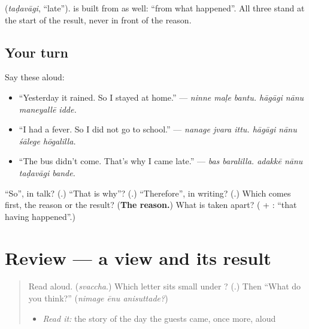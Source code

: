 \textbf{} (\emph{taḍavāgi}, \textquotedblleft{}late\textquotedblright{}). \textbf{} is built from \textbf{} as well: \textquotedblleft{}from what happened\textquotedblright{}. All three stand at the start of the result, never in front of the reason.

\subsection*{Your turn}
Say these aloud:

\begin{itemize}
\raggedright
  \item \textquotedblleft{}Yesterday it rained. So I stayed at home.\textquotedblright{} — \emph{ninne maḷe bantu. hāgāgi nānu maneyallē idde.}
  \item \textquotedblleft{}I had a fever. So I did not go to school.\textquotedblright{} — \emph{nanage jvara ittu. hāgāgi nānu śālege hōgalilla.}
  \item \textquotedblleft{}The bus didn't come. That's why I came late.\textquotedblright{} — \emph{bas baralilla. adakkē nānu taḍavāgi bande.}
\end{itemize}

\begin{tcolorbox}[breakable,colback=teal!4,colframe=teal!35!black,title={Before you move on}]
\textquotedblleft{}So\textquotedblright{}, in talk? (\textbf{}.) \textquotedblleft{}That is why\textquotedblright{}? (\textbf{}.) \textquotedblleft{}Therefore\textquotedblright{}, in writing? (\textbf{}.) Which comes first, the reason or the result? (\textbf{The reason.}) What is \textbf{} taken apart? (\textbf{} + \textbf{}: \textquotedblleft{}that having happened\textquotedblright{}.)
\end{tcolorbox}
\section[(review)]{Review — a view and its result}

\label{lesson:KA-R311-opinion-and-result}



\begin{quote}
Read \textbf{} aloud. (\emph{svaccha}.) Which letter sits small under \textbf{}? (\textbf{}.) Then \textquotedblleft{}What do you think?\textquotedblright{} (\emph{nimage ēnu anisuttade?})

\begin{itemize}
\raggedright
  \item \emph{Read it:} the story of the day the guests came, once more, aloud
\end{itemize}
\end{quote}

